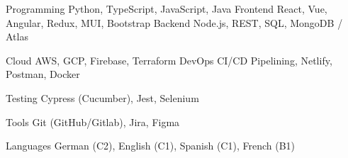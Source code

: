 

\begin{cvskills}

  \cvskill
    {Programming}
    {Python, TypeScript, JavaScript, Java}
  \cvskill
    {Frontend} %
    {React, Vue, Angular, Redux, MUI, Bootstrap}
  \cvskill
    {Backend}
    {Node.js, REST, SQL, MongoDB / Atlas}

  \cvskill
    {Cloud} 
    {AWS, GCP, Firebase, Terraform}
  \cvskill
    {DevOps}
    {CI/CD Pipelining, Netlify, Postman, Docker}
    
  \cvskill
    {Testing}
    {Cypress (Cucumber), Jest, Selenium}

  \cvskill
    {Tools}
    {Git (GitHub/Gitlab), Jira, Figma}

  \cvskill
    {Languages}
    {German (C2), English (C1), Spanish (C1), French (B1)}

\end{cvskills}
